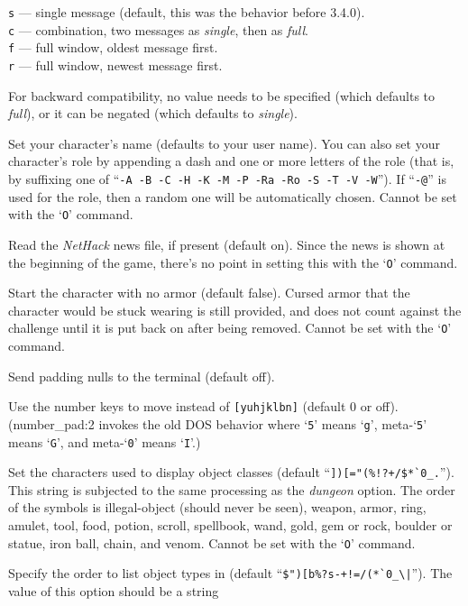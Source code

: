 {\tt s} --- single message (default, this was the behavior before 3.4.0).\\
{\tt c} --- combination, two messages as {\it single\/}, then as {\it full\/}.\\
{\tt f} --- full window, oldest message first.\\
{\tt r} --- full window, newest message first.

For backward compatibility, no value needs to be specified (which
defaults to {\it full\/}), or it can be negated (which defaults
to {\it single\/}). 
\item[\ib{name}]
Set your character's name (defaults to your user name).  You can also
set your character's role by appending a dash and one or more letters of
the role (that is, by suffixing one of
``{\tt -A -B -C -H -K -M -P -Ra -Ro -S -T -V -W}'').
If ``{\tt -@}'' is used for the role, then a random one will be
automatically chosen.
Cannot be set with the `{\tt O}' command.
\item[\ib{news}]
Read the {\it NetHack\/} news file, if present (default on).
Since the news is shown at the beginning of the game, there's no point
in setting this with the `{\tt O}' command.
\item[\ib{nudist}]
Start the character with no armor (default false).  Cursed armor that
the character would be stuck wearing is still provided, and does not
count against the challenge until it is put back on after being removed.
Cannot be set with the `{\tt O}' command.
\item[\ib{null}]
Send padding nulls to the terminal (default off).
\item[\ib{number\_pad}]
Use the number keys to move instead of {\tt [yuhjklbn]} (default 0 or off).
(number\_pad:2 invokes the old DOS behavior where `{\tt 5}' means `{\tt g}', 
meta-`{\tt 5}' means `{\tt G}',  and meta-`{\tt 0}' means `{\tt I}'.)
\item[\ib{objects}]
Set the characters used to display object classes (default
``\verb&])[="(%!?+/$*`0_.&'').
This string is subjected to the same processing as the {\it dungeon\/} option.
The order of the symbols is
illegal-object (should never be seen), weapon, armor, ring, amulet, tool,
food, potion, scroll, spellbook, wand, gold, gem or rock, boulder or statue,
iron ball, chain, and venom.
Cannot be set with the `{\tt O}' command.
\item[\ib{packorder}]
Specify the order to list object types in (default
``\verb&$")[b%?s-+!=/(*`0_\|&''). The value of this option should be a string
